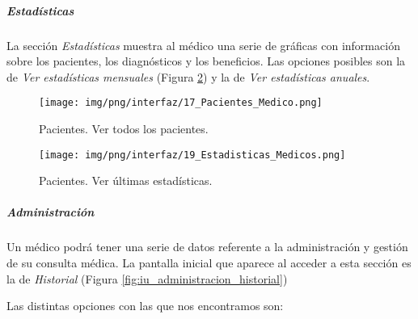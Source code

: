 \documentclass[a4paper,oneside,11pt]{book}
\begin{document}
			
		
		
		
		
		\subparagraph{Estadísticas} %
		\label{par:medico_estadisticas}
		
		La sección \textit{Estadísticas} muestra al médico una serie de gráficas con información sobre los pacientes, los diagnósticos y los beneficios. Las opciones posibles son la de \textit{Ver estadísticas mensuales} (Figura \ref{fig:iu_estadisticas_medico}) y la de  \textit{Ver estadísticas anuales}.
					
		\begin{figure}[H]
		  \centering
		    \texttt{[image: img/png/interfaz/17\_Pacientes\_Medico.png]}
		  \caption{Pacientes. Ver todos los pacientes.}
		  \label{fig:iu_pacientes_medico}
		\end{figure}
		
		\begin{figure}[H]
		  \centering
		    \texttt{[image: img/png/interfaz/19\_Estadisticas\_Medicos.png]}
		  \caption{Pacientes. Ver últimas estadísticas.}
		  \label{fig:iu_estadisticas_medico}
		\end{figure}
		
		
		
		\subparagraph{Administración} %
		\label{par:medico_administracion}
		
			Un médico podrá tener una serie de datos referente a la administración y gestión de su consulta médica. La pantalla inicial que aparece al acceder a esta sección es la de \textit{Historial} (Figura \ref{fig:iu_administracion_historial})
			
			Las distintas opciones con las que nos encontramos son:
			
\end{document}
